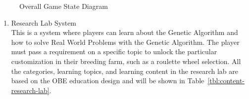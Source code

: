 \documentclass[12pt,oneside,openright,a4paper]{cpe-english-project}
\begin{document}
\begin{itemize}
\begin{figure}[!h]\centering
{}
\caption{Overall Game State Diagram}
\label{fig:design-state-diagram}
\end{figure}

\begin{enumerate}
	\item Research Lab System \\
	This is a system where players can learn about the Genetic Algorithm and how to solve Real World Problems with the Genetic Algorithm. The player must pass a requirement on a specific topic to unlock the particular customization in their breeding farm, such as a roulette wheel selection.
	All the categories, learning topics, and learning content in the research lab are based on the OBE education design and will be shown in Table~\ref{tbl:content-research-lab}.


\end{enumerate}
\end{itemize}
\end{document}
